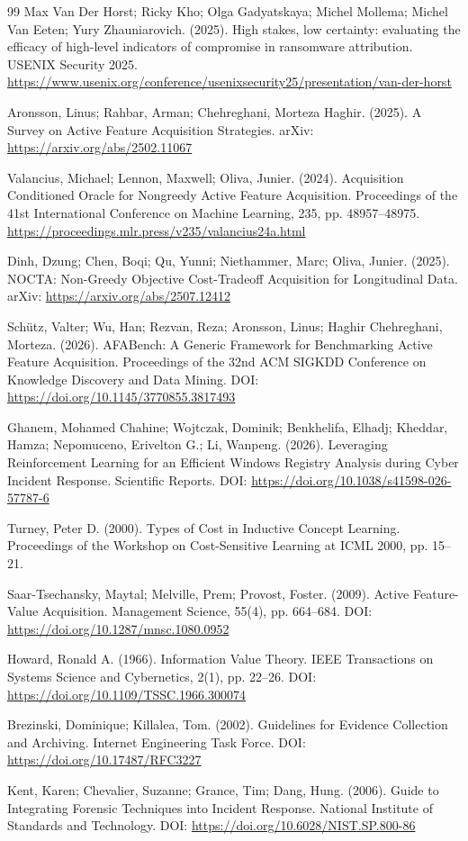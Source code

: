 \documentclass[UTF8,a4paper,twocolumn,zihao=5,fontset=fandol]{ctexart}
\begin{document}
\begin{thebibliography}{99}
Max Van Der Horst; Ricky Kho; Olga Gadyatskaya; Michel Mollema; Michel Van Eeten; Yury Zhauniarovich. (2025). High stakes, low certainty: evaluating the efficacy of high-level indicators of compromise in ransomware attribution. USENIX Security 2025. \url{https://www.usenix.org/conference/usenixsecurity25/presentation/van-der-horst}

Aronsson, Linus; Rahbar, Arman; Chehreghani, Morteza Haghir. (2025). A Survey on Active Feature Acquisition Strategies. arXiv: \url{https://arxiv.org/abs/2502.11067}

Valancius, Michael; Lennon, Maxwell; Oliva, Junier. (2024). Acquisition Conditioned Oracle for Nongreedy Active Feature Acquisition. Proceedings of the 41st International Conference on Machine Learning, 235, pp. 48957--48975. \url{https://proceedings.mlr.press/v235/valancius24a.html}

Dinh, Dzung; Chen, Boqi; Qu, Yunni; Niethammer, Marc; Oliva, Junier. (2025). NOCTA: Non-Greedy Objective Cost-Tradeoff Acquisition for Longitudinal Data. arXiv: \url{https://arxiv.org/abs/2507.12412}

Schütz, Valter; Wu, Han; Rezvan, Reza; Aronsson, Linus; Haghir Chehreghani, Morteza. (2026). AFABench: A Generic Framework for Benchmarking Active Feature Acquisition. Proceedings of the 32nd ACM SIGKDD Conference on Knowledge Discovery and Data Mining. DOI: \url{https://doi.org/10.1145/3770855.3817493}

Ghanem, Mohamed Chahine; Wojtczak, Dominik; Benkhelifa, Elhadj; Kheddar, Hamza; Nepomuceno, Erivelton G.; Li, Wanpeng. (2026). Leveraging Reinforcement Learning for an Efficient Windows Registry Analysis during Cyber Incident Response. Scientific Reports. DOI: \url{https://doi.org/10.1038/s41598-026-57787-6}

Turney, Peter D. (2000). Types of Cost in Inductive Concept Learning. Proceedings of the Workshop on Cost-Sensitive Learning at ICML 2000, pp. 15--21.

Saar-Tsechansky, Maytal; Melville, Prem; Provost, Foster. (2009). Active Feature-Value Acquisition. Management Science, 55(4), pp. 664--684. DOI: \url{https://doi.org/10.1287/mnsc.1080.0952}

Howard, Ronald A. (1966). Information Value Theory. IEEE Transactions on Systems Science and Cybernetics, 2(1), pp. 22--26. DOI: \url{https://doi.org/10.1109/TSSC.1966.300074}

Brezinski, Dominique; Killalea, Tom. (2002). Guidelines for Evidence Collection and Archiving. Internet Engineering Task Force. DOI: \url{https://doi.org/10.17487/RFC3227}

Kent, Karen; Chevalier, Suzanne; Grance, Tim; Dang, Hung. (2006). Guide to Integrating Forensic Techniques into Incident Response. National Institute of Standards and Technology. DOI: \url{https://doi.org/10.6028/NIST.SP.800-86}

\end{thebibliography}
\end{document}
